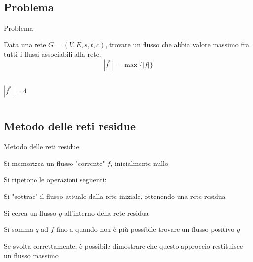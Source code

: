 \subsection{Problema}

\begin{frame}{Problema}

\vspace{-9pt}
\begin{myboxtitle}
Data una rete $G=(V,E,s,t,c)$, trovare un flusso che abbia valore massimo fra 
tutti i flussi associabili alla rete.
\[
  |f^*| = \max \{ |f| \}
\]
\end{myboxtitle}

\begin{columns}[T]
\[|f^*| = 4\]
\vspace{-12pt}
\end{columns}

\end{frame}

\subsection{Metodo delle reti residue}


\begin{frame}{Metodo delle reti residue}

\vspace{-9pt}
\begin{myboxtitle}
\BIL
\item Si memorizza un flusso "corrente" $f$, inizialmente nullo
\item Si ripetono le operazioni seguenti:
  \BIL
  \item Si "sottrae" il flusso attuale dalla rete iniziale, ottenendo una
    rete residua
  \item Si cerca un flusso $g$ all'interno della rete residua
  \item Si somma $g$ ad $f$
  \EIL
  fino a quando non è più possibile trovare un flusso positivo $g$
\EIL
\end{myboxtitle}

\begin{myboxtitle}[Output]
Se svolta correttamente, è possibile dimostrare che questo approccio restituisce
un flusso massimo
\end{myboxtitle}

\end{frame}




